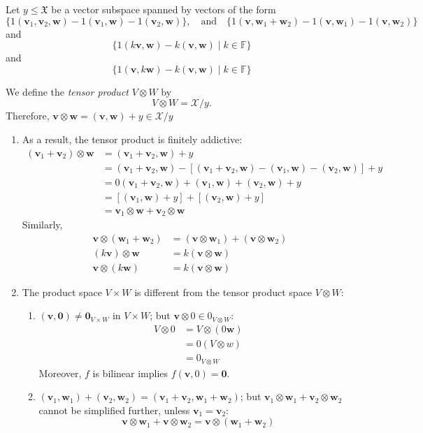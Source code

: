 \begin{definition}
Let ${y}\le\mathfrak{X}$ be a vector subspace spanned by vectors of the form
\[
\{1(\bm v_1,\bm v_2,\bm w) - 1(\bm v_1,\bm w) - 1(\bm v_2,\bm w)\},
\quad
\text{and}
\quad
\{1(\bm v,\bm w_1+\bm w_2) - 1(\bm v,\bm w_1) - 1(\bm v,\bm w_2)\}
\]
and
\[
\{1(k\bm v,\bm w) - k(\bm v,\bm w)\mid k\in\mathbb{F}\}
\]
and
\[
\{1(\bm v,k\bm w) - k(\bm v,\bm w)\mid k\in\mathbb{F}\}
\]
\end{definition}
\begin{definition}
We define the \emph{tensor product} $V\otimes W$ by 
\[
V\otimes W = \mathcal{X}/{y}.
\]
Therefore, $\bm v\otimes\bm w = (\bm v,\bm w)+{y}\in \mathcal{X}/{y}$
\end{definition}
\begin{remark}
\begin{enumerate}
\item
As a result, the tensor product is finitely addictive:
\begin{align*}
(\bm v_1+\bm v_2)\otimes\bm w&=(\bm v_1+\bm v_2,\bm w)+y\\
&=(\bm v_1+\bm v_2,\bm w)-[(\bm v_1+\bm v_2,\bm w) - (\bm v_1,\bm w) - (\bm v_2,\bm w)]+y\\
&=0(\bm v_1+\bm v_2,\bm w) + (\bm v_1,\bm w) + (\bm v_2,\bm w) + y\\
&=[(\bm v_1,\bm w)+y]+[(\bm v_2,\bm w)+y]\\
&=\bm v_1\otimes\bm w + \bm v_2\otimes\bm w
\end{align*}
Similarly, 
\begin{align*}
\bm v\otimes(\bm w_1+\bm w_2)&=(\bm v\otimes\bm w_1)+(\bm v\otimes\bm w_2)\\
(k\bm v)\otimes\bm w&=k(\bm v\otimes\bm w)\\
\bm v\otimes(k\bm w)&=k(\bm v\otimes\bm w)
\end{align*}
\item
The product space $V\times W$ is different from the tensor product space $V\otimes W$:
\begin{enumerate}
\item
$(\bm v,\bm0)\ne\bm0_{V\times W}$ in $V\times W$;
but $\bm v\otimes0\in 0_{V\otimes W}$:
\begin{align*}
V\otimes0&=V\otimes(0\bm w)\\
&=0(V\otimes w)\\
&=0_{V\otimes W}
\end{align*}
Moreover, $f$ is bilinear implies $f(\bm v,0)=\bm0$.
\item
$(\bm v_1,\bm w_1)+(\bm v_2,\bm w_2)=(\bm v_1+\bm v_2,\bm w_1+\bm w_2)$;
but $\bm v_1\otimes\bm w_1+\bm v_2\otimes\bm w_2$ cannot be simplified further, unless $\bm v_1=\bm v_2$:
\[
\bm v\otimes\bm w_1+\bm v\otimes\bm w_2 = \bm v\otimes(\bm w_1+\bm w_2)
\]
\end{enumerate}
\end{enumerate}
\end{remark}



